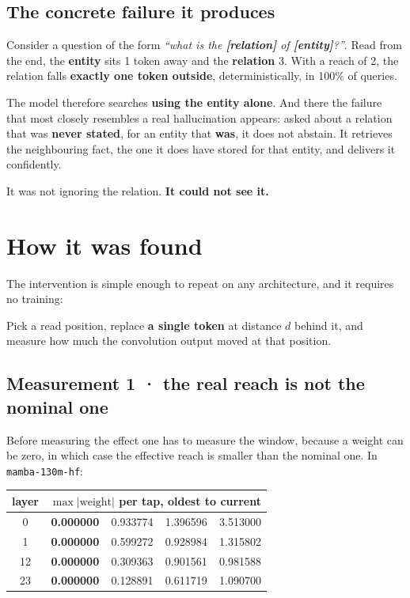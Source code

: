 \documentclass[11pt,a4paper]{article}
\begin{document}
\subsection*{The concrete failure it produces}

Consider a question of the form \emph{``what is the \textbf{[relation]} of \textbf{[entity]}?''}. Read
from the end, the \textbf{entity} sits 1 token away and the \textbf{relation} 3. With a reach of 2,
the relation falls \textbf{exactly one token outside}, deterministically, in 100\% of queries.

The model therefore searches \textbf{using the entity alone}. And there the failure that most closely
resembles a real hallucination appears: asked about a relation that was \textbf{never stated}, for an
entity that \textbf{was}, it does not abstain. It retrieves the neighbouring fact, the one it does
have stored for that entity, and delivers it confidently.

It was not ignoring the relation. \textbf{It could not see it.}

\section{How it was found}

The intervention is simple enough to repeat on any architecture, and it requires no training:

\begin{center}
\end{center}

Pick a read position, replace \textbf{a single token} at distance $d$ behind it, and measure how much
the convolution output moved at that position.

\subsection*{Measurement 1 · the real reach is not the nominal one}

Before measuring the effect one has to measure the window, because a weight can be zero, in which case
the effective reach is smaller than the nominal one. In \texttt{mamba-130m-hf}:

\begin{center}
\begin{tabular}{crrrr}
\toprule
layer & \multicolumn{4}{c}{$\max|\text{weight}|$ per tap, oldest to current} \\
\midrule
0  & \textbf{0.000000} & 0.933774 & 1.396596 & 3.513000 \\
1  & \textbf{0.000000} & 0.599272 & 0.928984 & 1.315802 \\
12 & \textbf{0.000000} & 0.309363 & 0.901561 & 0.981588 \\
23 & \textbf{0.000000} & 0.128891 & 0.611719 & 1.090700 \\
\bottomrule
\end{tabular}
\end{center}
\end{document}
